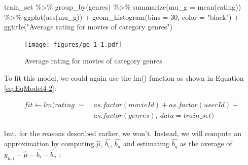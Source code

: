 \documentclass[
]{article}
\newenvironment{Shaded}{}{}
\newcommand{\AttributeTok}[1]{\textcolor[rgb]{0.49,0.56,0.16}{#1}}
\newcommand{\DecValTok}[1]{\textcolor[rgb]{0.25,0.63,0.44}{#1}}
\newcommand{\FunctionTok}[1]{\textcolor[rgb]{0.02,0.16,0.49}{#1}}
\newcommand{\NormalTok}[1]{#1}
\newcommand{\SpecialCharTok}[1]{\textcolor[rgb]{0.25,0.44,0.63}{#1}}
\newcommand{\StringTok}[1]{\textcolor[rgb]{0.25,0.44,0.63}{#1}}
\begin{document}
\begin{Shaded}
\begin{Highlighting}[]
\NormalTok{train\_set }\SpecialCharTok{\%\textgreater{}\%} \FunctionTok{group\_by}\NormalTok{(genres) }\SpecialCharTok{\%\textgreater{}\%} \FunctionTok{summarize}\NormalTok{(}\AttributeTok{mu\_g =} \FunctionTok{mean}\NormalTok{(rating)) }\SpecialCharTok{\%\textgreater{}\%} 
    \FunctionTok{ggplot}\NormalTok{(}\FunctionTok{aes}\NormalTok{(mu\_g)) }\SpecialCharTok{+} \FunctionTok{geom\_histogram}\NormalTok{(}\AttributeTok{bins =} \DecValTok{30}\NormalTok{, }\AttributeTok{color =} \StringTok{"black"}\NormalTok{) }\SpecialCharTok{+} 
    \FunctionTok{ggtitle}\NormalTok{(}\StringTok{"Average rating for movies of category genres"}\NormalTok{)}
\end{Highlighting}
\end{Shaded}

\begin{figure}
\centering
\texttt{[image: figures/ge\_1-1.pdf]}
\caption{Average rating for movies of category
genres\label{fig:average_ratings_for_movies_of_category_genres}}
\end{figure}

To fit this model, we could again use the lm() function as shown in
Equation \ref{eq:EqModel4-2}:

%
\par

\label{eq:EqModel4-2} \begin{equation}
\begin{split}
  fit \leftarrow lm(rating \; \sim \; & as.factor(movieId) + as.factor(userId) + \\ 
  & as.factor(genres), \: data = train\_{}set)
\end{split}
\end{equation}

but, for the reasons described earlier, we won't. Instead, we will
compute an approximation by computing \(\hat{\mu}\), \(\hat{b_{i}}\),
\(\hat{b_{u}}\) and estimating \(\hat{b_{g}}\) as the average of
\(y_{u,i}-\hat{\mu}-\hat{b_{i}}-\hat{b_{u}}\) :

%
\par
\end{document}
